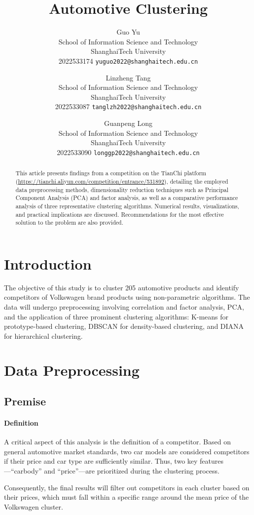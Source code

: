 \documentclass{article}
\title{Automotive Clustering}
\author{
    Guo Yu \\
    School of Information Science and Technology\\
    ShanghaiTech University\\
    2022533174
    \texttt{yuguo2022@shanghaitech.edu.cn} \\
    \and  
    Linzheng Tang \\
    School of Information Science and Technology \\
    ShanghaiTech University\\
    2022533087
    \texttt{tanglzh2022@shanghaitech.edu.cn} \\
    \and  
    Guanpeng Long \\
    School of Information Science and Technology \\
    ShanghaiTech University\\ 
    2022533090
    \texttt{longgp2022@shanghaitech.edu.cn} \\
  }
\begin{document}
\maketitle
\begin{abstract}
    This article presents findings from a competition on the TianChi platform
    (\url{https://tianchi.aliyun.com/competition/entrance/531892}), detailing the employed data preprocessing methods,
    dimensionality reduction techniques such as Principal Component Analysis (PCA) and factor analysis, as well as a comparative performance analysis of three representative clustering algorithms.
    Numerical results, visualizations, and practical implications are discussed.
    Recommendations for the most effective solution to the problem are also provided.

\end{abstract}

\section{Introduction}
The objective of this study is to cluster 205 automotive products and identify competitors of Volkswagen brand products using non-parametric algorithms.
The data will undergo preprocessing involving correlation and factor analysis, PCA, and the application of three prominent clustering algorithms: K-means for prototype-based clustering, DBSCAN for density-based clustering, and DIANA for hierarchical clustering.

\section{Data Preprocessing}
\subsection{Premise}

\paragraph{Definition}
A critical aspect of this analysis is the definition of a competitor.
Based on general automotive market standards, two car models are considered competitors if their price and car type are sufficiently similar.
Thus, two key features—``carbody'' and ``price''—are prioritized during the clustering process.

Consequently, the final results will filter out competitors in each cluster based on their prices, which must fall within a specific range around the mean price of the Volkswagen cluster.
\end{document}
